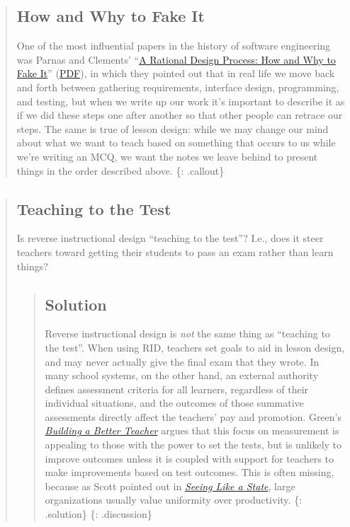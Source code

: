 \begin{quote}
\subsection{How and Why to Fake It}\label{how-and-why-to-fake-it}

One of the most influential papers in the history of software
engineering was Parnas and Clements'
``\href{http://dx.doi.org/10.1109/TSE.1986.6312940}{A Rational Design
Process: How and Why to Fake It}''
(\href{http://www.ics.uci.edu/~taylor/classes/121/IEEE86_Parnas_Clement.pdf}{PDF}),
in which they pointed out that in real life we move back and forth
between gathering requirements, interface design, programming, and
testing, but when we write up our work it's important to describe it as
if we did these steps one after another so that other people can retrace
our steps. The same is true of lesson design: while we may change our
mind about what we want to teach based on something that occurs to us
while we're writing an MCQ, we want the notes we leave behind to present
things in the order described above. \{: .callout\}
\end{quote}

\begin{quote}
\subsection{Teaching to the Test}\label{teaching-to-the-test}

Is reverse instructional design ``teaching to the test''? I.e., does it
steer teachers toward getting their students to pass an exam rather than
learn things?

\begin{quote}
\subsection{Solution}\label{solution}

Reverse instructional design is \emph{not} the same thing as ``teaching
to the test''. When using RID, teachers set goals to aid in lesson
design, and may never actually give the final exam that they wrote. In
many school systems, on the other hand, an external authority defines
assessment criteria for all learners, regardless of their individual
situations, and the outcomes of those summative assessments directly
affect the teachers' pay and promotion. Green's
\emph{\href{http://www.amazon.com/Building-Better-Teacher-Teaching-Everyone/dp/0393351084/}{Building
a Better Teacher}} argues that this focus on measurement is appealing to
those with the power to set the tests, but is unlikely to improve
outcomes unless it is coupled with support for teachers to make
improvements based on test outcomes. This is often missing, because as
Scott pointed out in
\emph{\href{http://www.amazon.com/Seeing-like-State-Certain-Condition/dp/0300078153/}{Seeing
Like a State}}, large organizations usually value uniformity over
productivity. \{: .solution\} \{: .discussion\}
\end{quote}
\end{quote}

